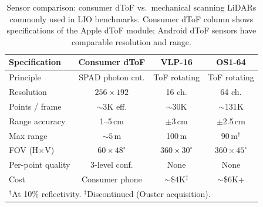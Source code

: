 \documentclass[journal]{IEEEtran}
\begin{document}
\begin{table}[t]
    \centering
    \caption{Sensor comparison: consumer dToF vs.\ mechanical scanning LiDARs commonly used in LIO benchmarks. Consumer dToF column shows specifications of the Apple dToF module; Android dToF sensors have comparable resolution and range.}
    \label{tab:sensor_comparison}
    \setlength{\tabcolsep}{3.5pt}
    \begin{tabular}{lccc}
        \toprule
        Specification & Consumer dToF & VLP-16 & OS1-64 \\
        \midrule
        Principle & SPAD photon cnt. & ToF rotating & ToF rotating \\
        Resolution & $256 \times 192$ & 16 ch. & 64 ch. \\
        Points / frame & ${\sim}3$K eff. & ${\sim}30$K & ${\sim}131$K \\
        Range accuracy & 1--5\,cm & $\pm$3\,cm & $\pm$2.5\,cm \\
        Max range & ${\sim}5$\,m & 100\,m & 90\,m$^\dagger$ \\
        FOV (H$\times$V) & $60\times48^{\circ}$ & $360\times30^{\circ}$ & $360\times45^{\circ}$ \\
        Per-point quality & 3-level conf. & None & None \\
        Cost & Consumer phone & ${\sim}$\$4K$^\ddagger$ & ${\sim}$\$6K+ \\
        \bottomrule
        \multicolumn{4}{l}{\scriptsize $^\dagger$At 10\% reflectivity. $^\ddagger$Discontinued (Ouster acquisition).}
    \end{tabular}
\end{table}
\end{document}
